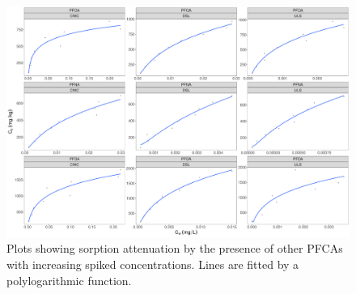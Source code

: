 \begin{figure}
    \centering
    \includegraphics[width=\textwidth]{R/figs/BC_single_attenuation.pdf}
    \caption{Plots showing sorption attenuation by the presence of other PFCAs with increasing spiked concentrations. Lines are fitted by a polylogarithmic function.}
    \label{fig:nonlinear_OND} 
\end{figure}



